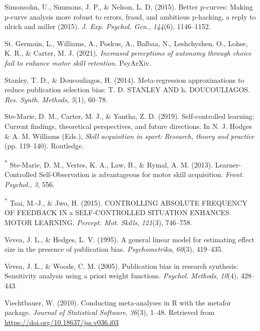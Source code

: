 \documentclass[
  english,
  man, donotrepeattitle,floatsintext]{apa7}
\newlength{\cslhangindent}
\newlength{\cslentryspacingunit} %
\newenvironment{CSLReferences}[2] %
 {%
  \setlength{\parindent}{0pt}
  \ifodd #1
  \let\oldpar\par
  \def\par{\hangindent=\cslhangindent\oldpar}
  \fi
  \setlength{\parskip}{#2\cslentryspacingunit}
 }%
 {}
\begin{document}
\begin{CSLReferences}{1}{0}
\leavevmode{}%
Simonsohn, U., Simmons, J. P., \& Nelson, L. D. (2015). Better p-curves: Making p-curve analysis more robust to errors, fraud, and ambitious p-hacking, a reply to ulrich and miller (2015). \emph{J. Exp. Psychol. Gen.}, \emph{144}(6), 1146--1152.

\leavevmode{}%
St. Germain, L., Williams, A., Poskus, A., Balbaa, N., Leshchyshen, O., Lohse, K. R., \& Carter, M. J. (2021). \emph{Increased perceptions of autonomy through choice fail to enhance motor skill retention}. PsyArXiv.

\leavevmode{}%
Stanley, T. D., \& Doucouliagos, H. (2014). Meta-regression approximations to reduce publication selection bias: T. D. {STANLEY} {AND} h. {DOUCOULIAGOS}. \emph{Res. Synth. Methods}, \emph{5}(1), 60--78.

\leavevmode{}%
Ste-Marie, D. M., Carter, M. J., \& Yantha, Z. D. (2019). Self-controlled learning: Current findings, theoretical perspectives, and future directions. In N. J. Hodges \& A. M. Williams (Eds.), \emph{Skill acquisition in sport: Research, theory and practice} (pp. 119--140). Routledge.

\leavevmode{}%
\textsuperscript{*} Ste-Marie, D. M., Vertes, K. A., Law, B., \& Rymal, A. M. (2013). {Learner-Controlled} {Self-Observation} is advantageous for motor skill acquisition. \emph{Front. Psychol.}, \emph{3}, 556.

\leavevmode{}%
\textsuperscript{*} Tsai, M.-J., \& Jwo, H. (2015). {CONTROLLING} {ABSOLUTE} {FREQUENCY} {OF} {FEEDBACK} {IN} a {SELF-CONTROLLED} {SITUATION} {ENHANCES} {MOTOR} {LEARNING}. \emph{Percept. Mot. Skills}, \emph{121}(3), 746--758.

\leavevmode{}%
Vevea, J. L., \& Hedges, L. V. (1995). A general linear model for estimating effect size in the presence of publication bias. \emph{Psychometrika}, \emph{60}(3), 419--435.

\leavevmode{}%
Vevea, J. L., \& Woods, C. M. (2005). Publication bias in research synthesis: Sensitivity analysis using a priori weight functions. \emph{Psychol. Methods}, \emph{10}(4), 428--443.

\leavevmode{}%
Viechtbauer, W. (2010). Conducting meta-analyses in {R} with the {metafor} package. \emph{Journal of Statistical Software}, \emph{36}(3), 1--48. Retrieved from \url{https://doi.org/10.18637/jss.v036.i03}


\end{CSLReferences}
\end{document}
